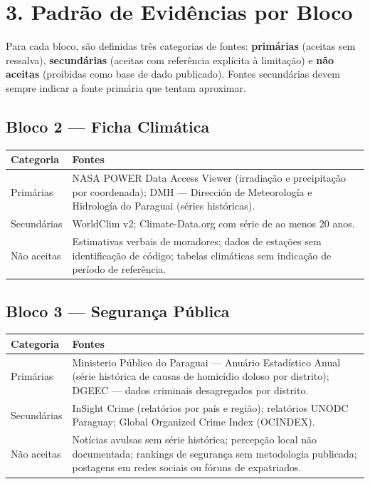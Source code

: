 \section*{3. Padrão de Evidências por Bloco}

Para cada bloco, são definidas três categorias de fontes: \textbf{primárias} (aceitas sem ressalva), \textbf{secundárias} (aceitas com referência explícita à limitação) e \textbf{não aceitas} (proibidas como base de dado publicado). Fontes secundárias devem sempre indicar a fonte primária que tentam aproximar.

\subsection*{Bloco 2 — Ficha Climática}

\begin{tabularx}{\linewidth}{lX}
\toprule
\textbf{Categoria} & \textbf{Fontes} \\
\midrule
Primárias    & NASA POWER Data Access Viewer (irradiação e precipitação por coordenada); DMH — Dirección de Meteorología e Hidrología do Paraguai (séries históricas). \\
Secundárias  & WorldClim v2; Climate-Data.org com série de ao menos 20 anos. \\
Não aceitas  & Estimativas verbais de moradores; dados de estações sem identificação de código; tabelas climáticas sem indicação de período de referência. \\
\bottomrule
\end{tabularx}

\subsection*{Bloco 3 — Segurança Pública}

\begin{tabularx}{\linewidth}{lX}
\toprule
\textbf{Categoria} & \textbf{Fontes} \\
\midrule
Primárias    & Ministerio Público do Paraguai — Anuário Estadístico Anual (série histórica de causas de homicídio doloso por distrito); DGEEC — dados criminais desagregados por distrito. \\
Secundárias  & InSight Crime (relatórios por país e região); relatórios UNODC Paraguay; Global Organized Crime Index (OCINDEX). \\
Não aceitas  & Notícias avulsas sem série histórica; percepção local não documentada; rankings de segurança sem metodologia publicada; postagens em redes sociais ou fóruns de expatriados. \\
\bottomrule
\end{tabularx}

